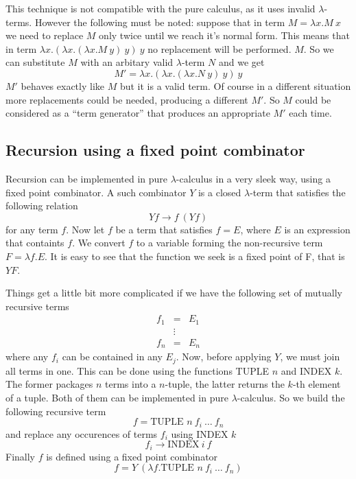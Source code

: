 \documentclass[a4paper,11pt]{article}
\newcommand{\la}{$\lambda$}
\newcommand{\lc}{$\lambda$-calculus}
\newcommand{\qm}[1]{``#1''}
\newcommand{\en}[1]{#1}
\begin{document}
This technique is not compatible with the pure calculus, as it uses invalid
\la-terms. However the following must be noted: suppose that in term
$M = \lambda x.M\ x$ we need to replace $M$ only twice until we reach it's normal
form. This means that in term $ \lambda x.(\lambda x.(\lambda x.M\ y)\ y)\ y $
no replacement will be performed. $M$. So we can substitute $M$ with an arbitary
valid \la-term $N$ and we get
\[ M' = \lambda x.(\lambda x.(\lambda x.N\ y)\ y)\ y \]
$M'$ behaves exactly like $M$ but it is a valid term. Of course in a different
situation more replacements could be needed, producing a different $M'$. So $M$
could be considered as a \qm{term generator} that produces an appropriate $M'$
each time.

\subsection{Recursion using a fixed point combinator}
\label{par_recfp}
Recursion can be implemented in pure \la-calculus in a very sleek way, using a
fixed point combinator. A such combinator $Y$ is a closed \la-term that
satisfies the following relation
\[ Y f \rightarrow f\ (Y f) \]
for any term $f$. Now let $f$ be a term that satisfies $f=E$, where $E$ is
an expression that containts $f$. We convert $f$ to a variable forming the
non-recursive term $F = \lambda f.E$. It is easy to see that the function we seek
is a fixed point of F, that is $Y F$.

Things get a little bit more complicated if we have the following set of mutually
recursive terms
\begin{eqnarray*}
	f_1 & = & E_1 \\
	& \vdots \\
	f_n & = & E_n
\end{eqnarray*}
where any $f_i$ can be contained in any $E_j$. Now, before applying $Y$, we must
join all terms in one. This can be done using the functions TUPLE $n$ and INDEX $k$.
The former packages $n$ terms into a $n$-tuple, the latter returns the $k$-th
element of a tuple. Both of them can be implemented in pure \lc. So we build
the following recursive term
\[ f = \textrm{\en{TUPLE }} n\ f_i \ \dots\ f_n \]
and replace any occurences of terms $f_i$ using INDEX $k$
\[ f_i \rightarrow \textrm{\en{INDEX}}\ i\ f \]
Finally $f$ is defined using a fixed point combinator
\[ f = Y\ (\lambda f.\textrm{\en{TUPLE }} n\ f_i \ \dots\ f_n ) \]
\end{document}
